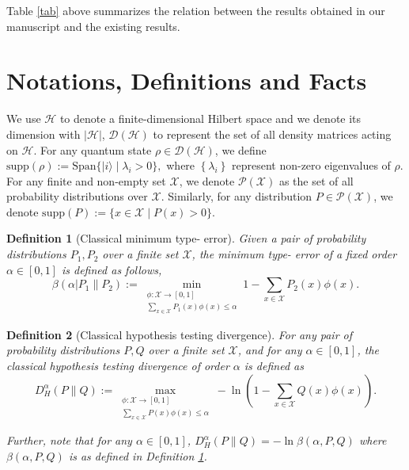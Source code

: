 \documentclass[onecolumn,ldraftcls, 11pt]{IEEEtran}
\newcommand{\RNum}[1]{\uppercase\expandafter{\romannumeral #1\relax}}
\newcommand*{\cP}{\mathcal{P}}
\newcommand*{\cH}{\mathcal{H}}
\newcommand*{\cD}{\mathcal{D}}
\newcommand*{\cX}{\mathcal{X}}
\newcommand{\ket}[1]{|#1 \rangle}
\newcommand{\abs}[1]{\left\vert#1\right\vert}
\newtheorem{definition}{Definition}
\begin{document}
Table \ref{tab} above summarizes the relation between the results obtained in our manuscript and the existing results. 




\section{Notations, Definitions and Facts}\label{sec_def_not}

We use $\cH$ to denote a finite-dimensional Hilbert space and we denote its dimension with $\abs{\cH}$, $\mathcal{D}(\cH)$ to represent the set of all density matrices acting on $\cH$. For any quantum state $\rho \in \cD(\cH)$, we define $\mbox{supp}(\rho):=\mbox{Span}\{\ket{i}\mid \lambda_{i}> 0\},$ where $\left\{\lambda_i\right\}$ represent non-zero eigenvalues of $\rho$. For any finite and non-empty set $\cX$, we denote $\cP(\cX)$ as the set of all probability distributions over $\cX$. Similarly, for any distribution $P \in \cP(\cX)$, we denote $\mbox{supp}(P):=\{x\in \mathcal{X}\mid P(x)>0\}.$ 

\begin{definition}[Classical minimum type-\RNum{2} error]\label{def_min_type2_err}
    Given a pair of probability distributions $P_1,P_2$ over a finite set $\cX$, the minimum type-\RNum{2} error of a fixed order $\alpha \in [0,1]$ is defined as follows,
    \begin{equation}
        \beta(\alpha|P_1\|P_2) := \min_{\substack{\phi: \cX \to [0,1]\\ \sum_{x \in \cX} P_1(x)\phi(x) \leq \alpha}} 1 - \sum_{x \in \cX} P_2(x)\phi(x).\label{def_min_type2_err_eq}
    \end{equation}
\end{definition}


\begin{definition}[Classical hypothesis testing divergence]\label{def_hyp_div}
    For any pair of probability distributions $P,Q$ over a finite set $\cX$, and for any $\alpha \in [0,1]$, the classical hypothesis testing divergence of order $\alpha$ is defined as
    \begin{equation}
        D^{\alpha}_{H}(P\|Q) := \max_{\substack{\phi: \cX \to [0,1]\\ \sum_{x \in \cX} P(x)\phi(x) \leq \alpha}} -\ln \left( 1 - \sum_{x \in \cX} Q(x)\phi(x) \right).
    \end{equation}

    Further, note that for any $\alpha \in [0,1]$, $D^{\alpha}_{H}(P\|Q) = -\ln \beta(\alpha,P,Q)$ where $\beta(\alpha,P,Q)$ is as defined in Definition \ref{def_min_type2_err}.
\end{definition}
\end{document}
